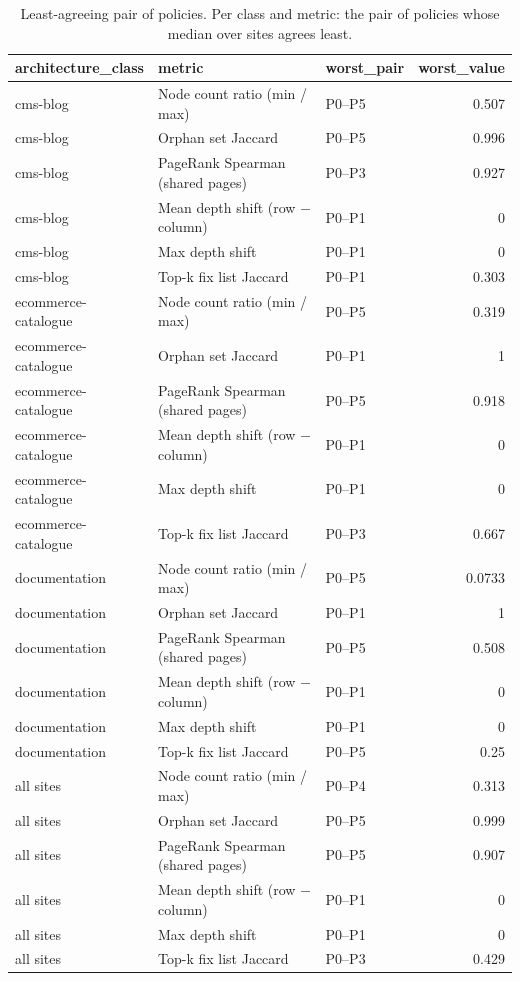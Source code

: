 \begin{table}[t]
\centering
\small
\caption{Least-agreeing pair of policies. Per class and metric: the pair of policies whose median over sites agrees least.}
\label{tab:t1_e1_least_agreeing}
\begin{tabular}{lllr}
\toprule
architecture\_class & metric & worst\_pair & worst\_value \\
\midrule
cms-blog & Node count ratio (min / max) & P0--P5 & 0.507 \\
cms-blog & Orphan set Jaccard & P0--P5 & 0.996 \\
cms-blog & PageRank Spearman (shared pages) & P0--P3 & 0.927 \\
cms-blog & Mean depth shift (row $-$ column) & P0--P1 & 0 \\
cms-blog & Max \textbar{}depth shift\textbar{} & P0--P1 & 0 \\
cms-blog & Top-k fix list Jaccard & P0--P1 & 0.303 \\
ecommerce-catalogue & Node count ratio (min / max) & P0--P5 & 0.319 \\
ecommerce-catalogue & Orphan set Jaccard & P0--P1 & 1 \\
ecommerce-catalogue & PageRank Spearman (shared pages) & P0--P5 & 0.918 \\
ecommerce-catalogue & Mean depth shift (row $-$ column) & P0--P1 & 0 \\
ecommerce-catalogue & Max \textbar{}depth shift\textbar{} & P0--P1 & 0 \\
ecommerce-catalogue & Top-k fix list Jaccard & P0--P3 & 0.667 \\
documentation & Node count ratio (min / max) & P0--P5 & 0.0733 \\
documentation & Orphan set Jaccard & P0--P1 & 1 \\
documentation & PageRank Spearman (shared pages) & P0--P5 & 0.508 \\
documentation & Mean depth shift (row $-$ column) & P0--P1 & 0 \\
documentation & Max \textbar{}depth shift\textbar{} & P0--P1 & 0 \\
documentation & Top-k fix list Jaccard & P0--P5 & 0.25 \\
all sites & Node count ratio (min / max) & P0--P4 & 0.313 \\
all sites & Orphan set Jaccard & P0--P5 & 0.999 \\
all sites & PageRank Spearman (shared pages) & P0--P5 & 0.907 \\
all sites & Mean depth shift (row $-$ column) & P0--P1 & 0 \\
all sites & Max \textbar{}depth shift\textbar{} & P0--P1 & 0 \\
all sites & Top-k fix list Jaccard & P0--P3 & 0.429 \\
\bottomrule
\end{tabular}
\end{table}
